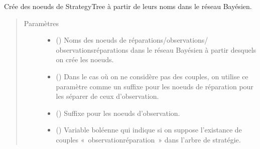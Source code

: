 \documentclass[letterpaper,10pt,french]{sphinxmanual}
\begin{document}
\begin{fulllineitems}
\begin{fulllineitems}
\end{fulllineitems}


\begin{fulllineitems}
\label{\detokenize{index:DecisionTheoreticTroubleshooting.TroubleShootingProblem._create_nodes}}
Crée des noeuds de StrategyTree à partir de leurs noms dans le réseau
Bayésien.
\begin{quote}\begin{description}
\item[{Paramètres}] \leavevmode\begin{itemize}
\item {} 
 (\sphinxstyleliteralemphasis{\sphinxupquote{(}}\sphinxstyleliteralemphasis{\sphinxupquote{)}}) \textendash{} Noms des noeuds de réparations/observations/
observations\sphinxhyphen{}réparations dans le réseau Bayésien à partir desquels
on crée les noeuds.

\item {} 
 (\sphinxstyleliteralemphasis{\sphinxupquote{, }}) \textendash{} Dans le cas où on ne considère pas des couples, on utilise ce
paramètre comme un suffixe pour les noeuds de réparation pour les
séparer de ceux d’observation.

\item {} 
 (\sphinxstyleliteralemphasis{\sphinxupquote{, }}) \textendash{} Suffixe pour les noeuds d’observation.

\item {} 
 (\sphinxstyleliteralemphasis{\sphinxupquote{, }}) \textendash{} Variable boléenne qui indique si on suppose l’existance de couples
« observation\sphinxhyphen{}réparation » dans l’arbre de stratégie.


\end{itemize}
\end{description}
\end{quote}
\end{fulllineitems}
\end{fulllineitems}
\end{document}
